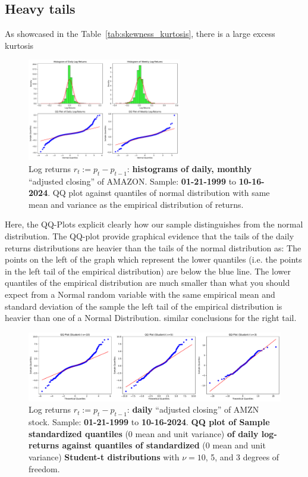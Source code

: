 \documentclass{article}
\begin{document}
\subsection{Heavy tails}
\noindent As showcased in the Table~\ref{tab:skewness_kurtosis}, there is a large excess kurtosis

\begin{figure}[H]
    \centering
    \includegraphics[width=0.6\textwidth]{Img/QQplot_daily_weekly_AMZN.pdf}
    \caption{Log returns $r_t := p_t - p_{t-1}$: \textbf{histograms of daily, monthly} “adjusted closing” of AMAZON. 
    Sample: \textbf{01-21-1999} to \textbf{10-16-2024}. QQ plot against quantiles of normal distribution with same mean and variance as the empirical distribution of returns.}
    \label{fig:Hstogram_QQ_plot}
\end{figure}

\noindent Here, the QQ-Plots explicit clearly how our sample distinguishes from the normal distribution. 
The QQ-plot provide graphical evidence that the tails of the daily returns distributions are heavier than the tails of the normal distribution as: The points on the left of the graph which represent the lower quantiles (i.e. the points in the left tail of the empirical distribution) are below the blue line. The lower quantiles of the empirical distribution are much smaller than what you should expect from a Normal random variable with the same empirical mean and standard deviation of the sample the left tail of the empirical distribution is heavier than one of a Normal Distribution. similar conclusions for the right tail.
\begin{figure}[H]
    \centering
    \includegraphics[width=1\textwidth]{Img/qqplt_tstudents_AMZNdaily.pdf}
    \caption{Log returns $r_t := p_t - p_{t-1}$: \textbf{daily} “adjusted closing” of AMZN stock. 
    Sample: \textbf{01-21-1999} to \textbf{10-16-2024}. \textbf{QQ plot of Sample standardized quantiles} (0 mean and unit variance) \textbf{of daily log-returns against quantiles of standardized} (0 mean and unit variance) \textbf{Student-t distributions} with $\nu = 10$, 5, and 3 degrees of freedom.}
    \label{fig:Hstogram_QQ_plot_T_student}
\end{figure}
\end{document}
